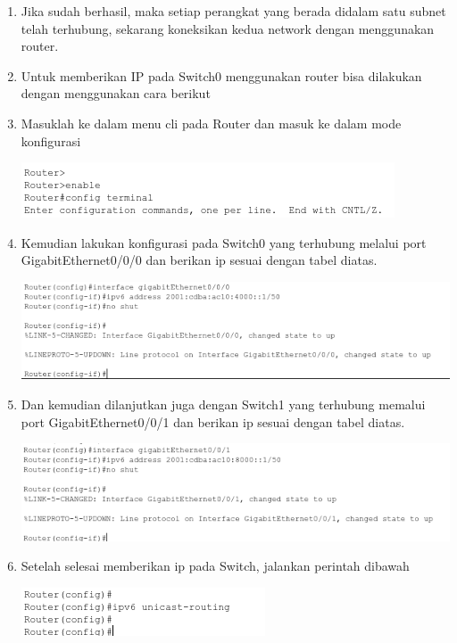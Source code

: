 \documentclass{article}
\begin{document}
\begin{flushleft}
\begin{enumerate}
            \item Jika sudah berhasil, maka setiap perangkat yang berada didalam satu subnet telah terhubung, sekarang koneksikan kedua network dengan menggunakan router.
            
            \item Untuk memberikan IP pada Switch0 menggunakan router bisa dilakukan dengan menggunakan cara berikut
            \item Masuklah ke dalam menu cli pada Router dan masuk ke dalam mode konfigurasi

            \includegraphics[]{3-5.png}

            \item Kemudian lakukan konfigurasi pada Switch0 yang terhubung melalui port GigabitEthernet0/0/0 dan berikan ip sesuai dengan tabel diatas.
            
            \includegraphics[scale=0.65]{3-6.png}

            \item Dan kemudian dilanjutkan juga dengan Switch1 yang terhubung memalui port GigabitEthernet0/0/1 dan berikan ip sesuai dengan tabel diatas.
            
            \includegraphics[scale=0.65]{3-7.png}

            \item Setelah selesai memberikan ip pada Switch, jalankan perintah dibawah

            \includegraphics[]{3-8.png}


\end{enumerate}
\end{flushleft}
\end{document}
